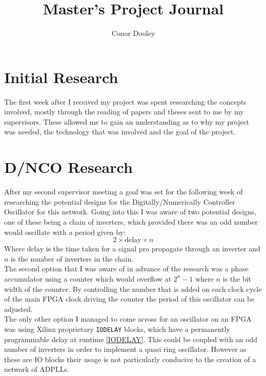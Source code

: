 \documentclass[a4paper,12pt]{report}
\begin{document}
\title{Master's Project Journal}
\author{Conor Dooley}
\maketitle
\section*{Initial Research}
The first week after I received my project was spent researching the concepts involved, mostly through the reading of papers and theses sent to me by my supervisors. These allowed me to gain an understanding as to why my project was needed, the technology that was involved and the goal of the project.

\section*{D/NCO Research}
After my second supervisor meeting a goal was set for the following week of researching the potential designs for the Digitally/Numerically Controller Oscillator for this network. Going into this I was aware of two potential designs, one of these being a chain of inverters, which provided there was an odd number would oscillate with a period given by:
$$ 2\times\text{delay}\times n $$
Where $\text{delay}$ is the time taken for a signal pro propagate through an inverter and $n$ is the number of inverters in the chain.\\
The second option that I was aware of in advance of the research was a phase accumulator using a counter which would overflow at $2^n-1$ where $n$ is the bit width of the counter. By controlling the number that is added on each clock cycle of the main FPGA clock driving the counter the period of this oscillator can be adjusted.\\
The only other option I managed to come across for an oscillator on an FPGA was using Xilinx proprietary \texttt{IODELAY} blocks, which have a permanently programmable delay at runtime \ref{IODELAY}. This could be coupled with an odd number of inverters in order to implement a quasi ring oscillator. However as these are IO blocks their usage is not particularly conducive to the creation of a network of ADPLLs.
\end{document}
